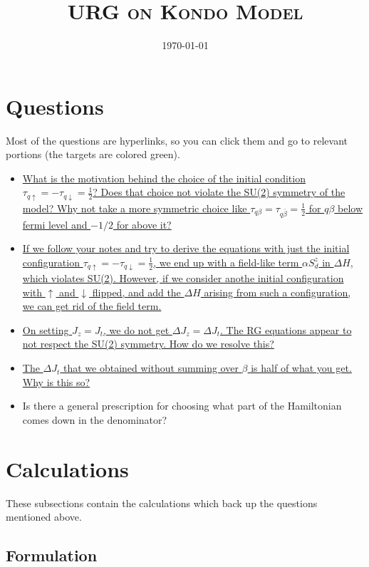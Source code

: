 \documentclass[14pt]{extarticle}
\author{}
\date{\today}
\title{\textsc{URG on Kondo Model}}
\numberwithin{equation}{section}
\begin{document}
\maketitle
\tableofcontents
\newpage
\section{Questions}
Most of the questions are hyperlinks, so you can click them and go to relevant portions (the targets are colored green).
\begin{itemize}
	\item \hyperlink{q1}{ What is the motivation behind the choice of the initial condition $\tau_{q \uparrow} = -\tau_{q\downarrow} = \frac{1}{2}$? Does that choice not violate the SU(2) symmetry of the model? Why not take a more symmetric choice like $\tau_{q\beta} =  \tau_{q\bar{\beta}} = \frac{1}{2}$ for $q\beta$ below fermi level and $-1/2$ for above it?}\\[10pt]
	\item \hyperlink{field}{If we follow your notes and try to derive the equations with just the initial configuration $\tau_{q \uparrow} = -\tau_{q\downarrow} = \frac{1}{2}$, we end up with a field-like term \(\alpha S_d^z\) in \(\Delta H\), which violates SU(2). However, if we consider anothe initial configuration with \(\uparrow\) and \(\downarrow\) flipped, and add the \(\Delta H\) arising from such a configuration, we can get rid of the field term.}\\[10pt]
	\item \hyperlink{q3}{On setting \(J_z=J_t\), we do not get \(\Delta J_z = \Delta J_t\). The RG equations appear to not respect the SU(2) symmetry. How do we resolve this?}\\[10pt]
	\item \hyperlink{q4}{The \(\Delta J_t\) that we obtained without summing over \(\beta\) is half of what you get. Why is this so?}\\[10pt]
	\item Is there a general prescription for choosing what part of the Hamiltonian comes down in the denominator?
\end{itemize}

\newpage
\section{Calculations}
These subsections contain the calculations which back up the questions mentioned above.
\subsection{Formulation}
\end{document}
